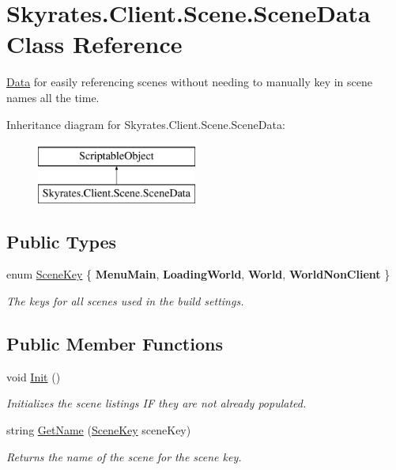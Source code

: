\hypertarget{class_skyrates_1_1_client_1_1_scene_1_1_scene_data}{\section{Skyrates.\-Client.\-Scene.\-Scene\-Data Class Reference}
\label{class_skyrates_1_1_client_1_1_scene_1_1_scene_data}
}


\hyperlink{namespace_skyrates_1_1_client_1_1_data}{Data} for easily referencing scenes without needing to manually key in scene names all the time.  


Inheritance diagram for Skyrates.\-Client.\-Scene.\-Scene\-Data\-:\begin{figure}[H]
\begin{center}
\leavevmode
\includegraphics[height=2.000000cm]{class_skyrates_1_1_client_1_1_scene_1_1_scene_data}
\end{center}
\end{figure}
\subsection*{Public Types}
\begin{DoxyCompactItemize}
\item 
enum \hyperlink{class_skyrates_1_1_client_1_1_scene_1_1_scene_data_a31ee71a248fd3456a7e655f71f268583}{Scene\-Key} \{ {\bfseries Menu\-Main}, 
{\bfseries Loading\-World}, 
{\bfseries World}, 
{\bfseries World\-Non\-Client}
 \}
\begin{DoxyCompactList}\small\item\em The keys for all scenes used in the build settings. \end{DoxyCompactList}\end{DoxyCompactItemize}
\subsection*{Public Member Functions}
\begin{DoxyCompactItemize}
\item 
void \hyperlink{class_skyrates_1_1_client_1_1_scene_1_1_scene_data_a00dcd79ce09e252eddcf4c7d63f00c1b}{Init} ()
\begin{DoxyCompactList}\small\item\em Initializes the scene listings I\-F they are not already populated. \end{DoxyCompactList}\item 
string \hyperlink{class_skyrates_1_1_client_1_1_scene_1_1_scene_data_ad89365f7fbe01c52f3d421dcaf9ee1e6}{Get\-Name} (\hyperlink{class_skyrates_1_1_client_1_1_scene_1_1_scene_data_a31ee71a248fd3456a7e655f71f268583}{Scene\-Key} scene\-Key)
\begin{DoxyCompactList}\small\item\em Returns the name of the scene for the scene key. \end{DoxyCompactList}\end{DoxyCompactItemize}
